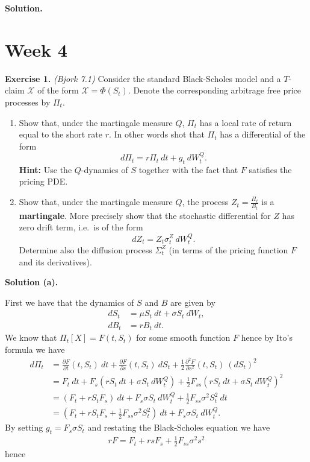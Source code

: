 \documentclass[a4paper,12pt,openany]{book}
\providecommand{\tightlist}{%
 \setlength{\itemsep}{0pt}\setlength{\parskip}{0pt}}
\begin{document}
\textbf{Solution.}

\hypertarget{week-4}{%
\section{Week 4}\label{week-4}}

\textbf{Exercise 1.} \emph{(Bjork 7.1)} Consider the standard Black-Scholes model and a \(T\)-claim \(\mathcal{X}\) of the form \(\mathcal{X}=\Phi(S_t)\). Denote the corresponding arbitrage free price processes by \(\Pi_t\).

\begin{enumerate}
\def\labelenumi{\alph{enumi}.}
\tightlist
\item
  Show that, under the martingale measure \(Q\), \(\Pi_t\) has a local rate of return equal to the short rate \(r\). In other words shot that \(\Pi_t\) has a differential of the form
  \[
    d\Pi_t=r\Pi_t\ dt+g_t\ dW_t^Q.
    \]
  \textbf{Hint:} Use the \(Q\)-dynamics of \(S\) together with the fact that \(F\) satisfies the pricing PDE.
\item
  Show that, under the martingale measure \(Q\), the process \(Z_t=\frac{\Pi_t}{B_t}\) is a \textbf{martingale}. More precisely show that the stochastic differential for \(Z\) has zero drift term, i.e.~is of the form
  \[
    dZ_t=Z_t\sigma_t^Z\ dW_t^Q.
    \]
  Determine also the diffusion process \(\Sigma_t^Z\) (in terms of the pricing function \(F\) and its derivatives).
\end{enumerate}

\textbf{Solution (a).}

First we have that the dynamics of \(S\) and \(B\) are given by
\begin{align*}
dS_t&=\mu S_t\ dt + \sigma S_t\ dW_t,\\
dB_t&=rB_t\ dt.
\end{align*}
We know that \(\Pi_t[X]=F(t,S_t)\) for some smooth function \(F\) hence by Ito's formula we have
\begin{align*}
d\Pi_t&=\frac{\partial F}{\partial t}(t,S_t)\ dt +\frac{\partial F}{\partial s}(t,S_t)\ dS_t+\frac{1}{2}\frac{\partial^2 F}{\partial s^2}(t,S_t)\ (dS_t)^2\\
&=F_t\ dt+F_s(r S_t\ dt + \sigma S_t\ dW^Q_t)+\frac{1}{2}F_{ss}(r S_t\ dt + \sigma S_t\ dW^Q_t)^2\\
&=(F_t+r S_t F_s)\ dt+F_s\sigma S_t\ dW^Q_t+\frac{1}{2}F_{ss}\sigma ^2S_t^2\ dt\\
&=(F_t+r S_tF_s+\frac{1}{2}F_{ss}\sigma ^2S_t^2)\ dt+F_s\sigma S_t\ dW^   Q_t.
\end{align*}
By setting \(g_t=F_s\sigma S_t\) and restating the Black-Scholes equation we have
\begin{align*}
rF=F_t+rsF_s+\frac{1}{2}F_{ss}\sigma ^2 s^2
\end{align*}
hence
\end{document}
